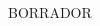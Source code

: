 \begin{titlepage}
    \vspace*{\fill}
    \begin{center}
        {\crest} \\[1.3cm]
        {\Large \gradua}\\
        {\espezialitatea}\\[1.5cm]
        
        {\large {\gapizenburua}}\\[0.2cm]
        \HRule \\[0.5cm]
        
        { \LARGE 
        \begin{spacing}{1}
        \textbf{\izenburua}
        \end{spacing}
        }
        \vspace{0.5cm}
        \HRule \\[2.0cm]
        
        { \egileatestua\\}
        {\Large \textsl{\egilea}\\}
        \vspace{1.0cm}
        
        {\large \textsf{\urtea}}
        \begin{tcolorbox}[breakable]
            BORRADOR
        \end{tcolorbox}
    \end{center}
    \vspace*{\fill}
\end{titlepage}

\cleardoublepage

